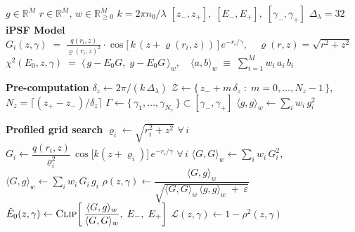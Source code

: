 \clearpage
\begin{algorithm}[H]
\caption{Nuisance-parameter estimation by profiled grid search + local refinement}
\label{alg:nuisance_est}
\begin{algorithmic}[1]
 
\Require $g \in \mathbb{R}^{M}$ 
\Require $r \in \mathbb{R}^{M}$, $w \in \mathbb{R}^{M}_{\ge 0}$ 
\Require $k = 2\pi n_0 / \lambda$ 
\Require $[z_-, z_+],\; [E_-, E_+],\; [\gamma_-, \gamma_+]$ 
\Require $\Delta_\lambda = 32$ 
\Statex
\Statex \textbf{iPSF Model}
\State $G_i(z,\gamma) \;=\; \frac{q(r_i,z)}{\varrho(r_i,z)^{2}} \cdot \cos\!\big[\, k\,(z + \varrho(r_i,z)) \,\big]\, e^{-r_i/\gamma}, \quad \varrho(r,z) = \sqrt{r^{2} + z^{2}}$
\State  $ \chi^{2}(E_0, z, \gamma) \;=\; \big\langle\, g - E_0 G,\; g - E_0 G \,\big\rangle_w,
    \quad
    \langle a, b\rangle_w \;\equiv\; \sum_{i=1}^{M} w_i\, a_i\, b_i$
\Statex
 
\Statex \textbf{Pre-computation}
\State $\delta_z \gets 2\pi / (k\,\Delta_\lambda)$ 
\State $\mathcal{Z} \gets \{\, z_- + m\,\delta_z \;:\; m = 0,\dots,N_z - 1 \,\}$, \quad $N_z = \lceil (z_+ - z_-)/\delta_z \rceil$
\State $\Gamma \gets \{\, \gamma_1, \dots, \gamma_{N_\gamma} \,\} \subset [\gamma_-, \gamma_+]$ 
\State $\langle g, g\rangle_w \gets \sum_i w_i\, g_i^{2}$ 
\Statex
 
\Statex \textbf{Profiled grid search} 
\For{$\gamma \in \Gamma$}
        \State $\varrho_i \gets \sqrt{r_i^{2} + z^{2}}$ \quad $\forall\, i$
        \State $G_i \gets \dfrac{q(r_i, z)}{\varrho_i^{2}}\,
            \cos\!\big[k(z + \varrho_i)\big]\, e^{-r_i/\gamma}$ \quad $\forall\, i$
        \Statex
        \State $\langle G, G\rangle_w \gets \sum_i w_i\, G_i^{2}$,
               \quad
               $\langle G, g\rangle_w \gets \sum_i w_i\, G_i\, g_i$
        \State $\rho(z,\gamma) \gets
            \dfrac{\langle G, g\rangle_w}
                  {\sqrt{\langle G, G\rangle_w \,\langle g, g\rangle_w \;+\; \varepsilon}}$
        \State $\hat{E}_0(z,\gamma) \gets \textsc{Clip}\!\left[\,
            \dfrac{\langle G, g\rangle_w}{\langle G, G\rangle_w},\; E_-,\; E_+ \right]$
            \label{ln:E0}
        \State $\mathcal{L}(z,\gamma) \gets 1 - \rho^{2}(z,\gamma)$
            \label{ln:L}
    \EndFor
\EndFor
\Statex
 

\end{algorithmic}
\end{algorithm}
